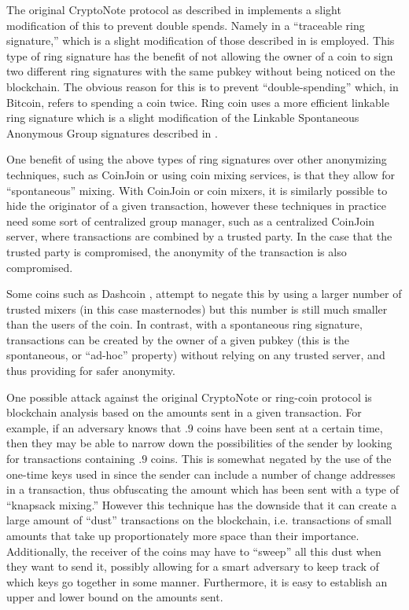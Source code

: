 \documentclass[12pt,oneside,english]{amsart}
\numberwithin{equation}{section}
\numberwithin{figure}{section}
\theoremstyle{plain}
\theoremstyle{plain}
\theoremstyle{remark}
\theoremstyle{plain}
\theoremstyle{remark}
\theoremstyle{remark}
\theoremstyle{plain}
\theoremstyle{definition}
\begin{document}
The original CryptoNote protocol as described in \cite{CN}
implements a slight modification of this to prevent double spends.
Namely in \cite{CN} a ``traceable ring signature,'' which is a slight modification of those described in 
\cite{FS} is employed. This type of ring signature has the benefit of not allowing the owner of a coin to
sign two different ring signatures with the same pubkey without being
noticed on the blockchain. The obvious reason for this is to prevent
``double-spending'' which, in Bitcoin, refers to
spending a coin twice. Ring coin \cite{B2,B} uses a more efficient linkable
ring signature which is a slight modification of the Linkable Spontaneous
Anonymous Group signatures described in \cite{LWW}.

One benefit of using the above types of ring signatures over other anonymizing techniques, such as CoinJoin \cite{GMc} or using coin mixing services,
is that they allow for ``spontaneous'' mixing. With CoinJoin or coin mixers, it is
similarly possible to hide the originator of a given transaction,
however these techniques in practice need some sort of centralized group manager, such as a centralized CoinJoin server, where transactions
are combined by a trusted party. In the case that the trusted party is compromised,
the anonymity of the transaction is also compromised. 

Some coins such
as Dashcoin \cite{DASH}, attempt to negate this by using a larger number
of trusted mixers (in this case masternodes) but this number is still
much smaller than the users of the coin. In contrast, with a spontaneous
ring signature, transactions can be created by the owner of a given
pubkey (this is the spontaneous, or ``ad-hoc'' property) without relying
on any trusted server, and thus providing for safer anonymity. 

One possible attack against the original CryptoNote or  ring-coin protocol \cite{CN,B2}
is blockchain analysis based on the amounts sent in a given transaction.
For example, if an adversary knows that $.9$ coins have been sent
at a certain time, then they may be able to narrow down the possibilities
of the sender by looking for transactions containing $.9$ coins.
This is somewhat negated by the use of the one-time keys used in \cite{CN}
since the sender can include a number of change addresses in a transaction,
thus obfuscating the amount which has been sent with a type of ``knapsack mixing.'' However this technique
has the downside that it can create a large amount of ``dust'' transactions
on the blockchain, i.e. transactions of small amounts that take up
proportionately more space than their importance. Additionally, the
receiver of the coins may have to ``sweep'' all this dust when they
want to send it, possibly allowing for a smart adversary to keep track
of which keys go together in some manner. Furthermore, it is easy to establish an upper and lower bound on the amounts sent. 
\end{document}
